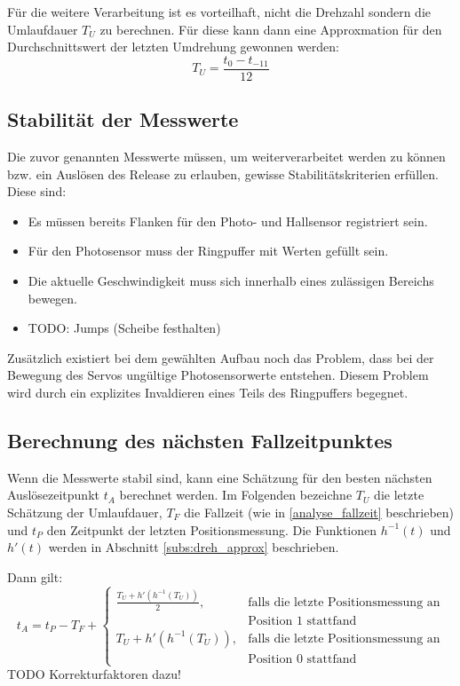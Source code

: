 Für die weitere Verarbeitung ist es vorteilhaft, nicht die Drehzahl sondern die Umlaufdauer $T_U$ zu berechnen.
Für diese kann dann eine Approxmation für den Durchschnittswert der letzten Umdrehung gewonnen werden:
\begin{equation*}
T_U = \frac{t_0 - t_{-11}}{12}
\end{equation*}

\subsection{Stabilität der Messwerte}\label{design_stabilitaet}
Die zuvor genannten Messwerte müssen, um weiterverarbeitet werden zu können bzw. ein Auslösen des Release zu erlauben, gewisse Stabilitätskriterien erfüllen.
Diese sind:
\begin{itemize}
	\item Es müssen bereits Flanken für den Photo- und Hallsensor registriert sein.
	\item Für den Photosensor muss der Ringpuffer mit Werten gefüllt sein.
	\item Die aktuelle Geschwindigkeit muss sich innerhalb eines zulässigen Bereichs bewegen.
	\item TODO: Jumps (Scheibe festhalten)
\end{itemize}

Zusätzlich existiert bei dem gewählten Aufbau noch das Problem, dass bei der Bewegung des Servos ungültige Photosensorwerte entstehen.
Diesem Problem wird durch ein explizites Invaldieren eines Teils des Ringpuffers begegnet.

\subsection{Berechnung des nächsten Fallzeitpunktes}\label{design_zeitpunkt}
Wenn die Messwerte stabil sind, kann eine Schätzung für den besten nächsten Auslösezeitpunkt $t_A$ berechnet werden.
Im Folgenden bezeichne $T_U$ die letzte Schätzung der Umlaufdauer, $T_F$ die Fallzeit (wie in \cref{analyse_fallzeit} beschrieben) und $t_P$ den Zeitpunkt der letzten Positionsmessung.
Die Funktionen $h^{-1}(t)$ und $h'(t)$ werden in Abschnitt \ref{subs:dreh_approx} beschrieben.

Dann gilt:
\begin{equation*}
t_A = t_P - T_F +
\begin{cases}
	\frac{T_U + h'(h^{-1}(T_U))}{2} , & \text{falls die letzte Positionsmessung an}\\
	&  \text{Position 1 stattfand}\\
	T_U + h'(h^{-1}(T_U)), & \text{falls die letzte Positionsmessung an}\\
	&  \text{Position 0 stattfand}
\end{cases}
\end{equation*}
TODO Korrekturfaktoren dazu!

